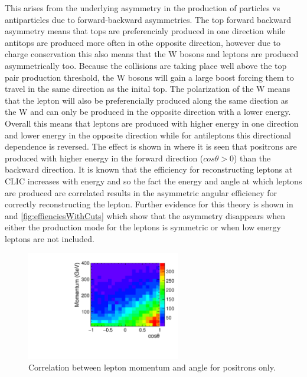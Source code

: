 This arises from the underlying asymmetry in the production of particles vs antiparticles due to forward-backward asymmetries. The top forward backward asymmetry means that tops are preferencialy produced in one direction while antitops are produced more often in othe opposite direction, however due to charge conservation this also means that the W bosons and leptons are produced asymmetrically too. Because the collisions are taking place well above the top pair production threshold, the W bosons will gain a large boost forcing them to travel in the same direction as the inital top. The polarization of the W means that the lepton will also be preferencially produced along the same diection as the W and can only be produced in the opposite direction with a lower energy. Overall this means that leptons are produced with higher energy in one direction and lower energy in the opposite direction while for antileptons this directional dependence is reversed. The effect is shown in  where it is seen that positrons are produced with higher energy in the forward direction ($cos\theta>0$) than the backward direction. It is known that the efficiency for reconstructing leptons at CLIC increases with energy and so the fact the energy and angle at which leptons are produced are correlated results in the asymmetric angular efficiency for correctly reconstructing the lepton. Further evidence for this theory is shown in  and \ref{fig:effienciesWithCuts} which show that the asymmetry disappears when either the production mode for the leptons is symmetric or when low energy leptons are not included.

\begin{figure}
  \centering
  \includegraphics[width=0.6\textwidth]{TopAnalysis/figures/MomentumVsTheta.pdf}
  \caption[Lepton Momentum Vs Angle]{Correlation between lepton momentum and angle for positrons only.}
  \label{fig:efficiency2d}
\end{figure}

